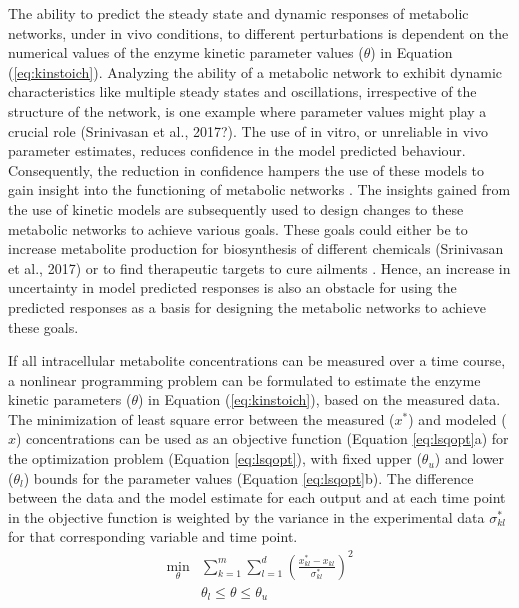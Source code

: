 \documentclass[10pt]{article}
\begin{document}
The ability to predict the steady state and dynamic responses of metabolic networks, under in vivo conditions, to different perturbations is dependent on the numerical values of the enzyme kinetic parameter values ($\theta$) in Equation (\ref{eq:kinstoich}). Analyzing the ability of a metabolic network to exhibit dynamic characteristics like multiple steady states and oscillations, irrespective of the structure of the network, is one example where parameter values might play a crucial role \parencite{Srinivasan2015, Vital-Lopez2006}(Srinivasan et al., 2017?). The use of in vitro, or unreliable in vivo parameter estimates, reduces confidence in the model predicted behaviour. Consequently, the reduction in confidence hampers the use of these models to gain insight into the functioning of metabolic networks \parencite{Tran2008, Chakrabarti2013a}. The insights gained from the use of kinetic models are subsequently used to design changes to these metabolic networks to achieve various goals. These goals could either be to increase metabolite production for biosynthesis of different chemicals \parencite{Almquist2014, Khodayari2016, Costa2016, Andreozzi2016}(Srinivasan et al., 2017) or to find therapeutic targets to cure ailments \parencite{Apaolaza2017}. Hence, an increase in uncertainty in model predicted responses is also an obstacle for using the predicted responses as a basis for designing the metabolic networks to achieve these goals.  

If all intracellular metabolite concentrations can be measured over a time course, a nonlinear programming problem can be formulated to estimate the enzyme kinetic parameters ($\theta$) in Equation (\ref{eq:kinstoich}), based on the measured data. The minimization of least square error between the measured ($x^*$) and modeled ($x$) concentrations can be used as an objective function (Equation \ref{eq:lsqopt}a) for the optimization problem (Equation \ref{eq:lsqopt}), with fixed upper ($\theta_u$) and lower ($\theta_l$) bounds for the parameter values (Equation \ref{eq:lsqopt}b). The difference between the data and the model estimate for each output and at each time point in the objective function is weighted by the variance in the experimental data $\sigma_{kl}^*$ for that corresponding variable and time point.
\begin{subequations}\label{eq:lsqopt}
	\begin{align}
	\underset{\theta}{\mathrm{min}} &\sum_{k=1}^{m}\sum_{l=1}^{d}\left(\frac{x_{kl}^*-x_{kl}}{\sigma_{kl}^*}\right)^2\\
	&\theta_l \le \theta \le \theta_u
	\end{align}
\end{subequations}
\end{document}
